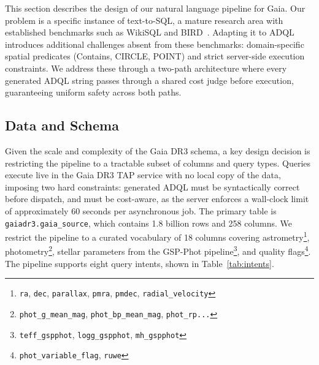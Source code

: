 \documentclass[fleqn,moreauthors,10pt]{ds_report}
\begin{document}
This section describes the design of our natural language pipeline for Gaia. 
Our problem is a specific instance of text-to-SQL, a mature research area with 
established benchmarks such as WikiSQL and 
BIRD~\cite{li2023llmservedatabaseinterface}. Adapting it to ADQL introduces 
additional challenges absent from these benchmarks: domain-specific spatial 
predicates (Contains, CIRCLE, POINT) and strict 
server-side execution constraints. We address these through a two-path 
architecture where every generated ADQL string passes through a shared cost 
judge before execution, guaranteeing uniform safety across both paths. 

\subsection{Data and Schema}

Given the scale and complexity of the Gaia DR3 schema, a key design decision 
is restricting the pipeline to a tractable subset of columns and query types. 
Queries execute live in the Gaia DR3 TAP service with no local copy of the
data, imposing two hard constraints: generated ADQL must be syntactically correct
before dispatch, and must be cost-aware, as the server enforces a wall-clock limit of approximately 60 seconds per asynchronous job. The primary table is
\texttt{gaiadr3.gaia\_source}, which contains 1.8 billion rows and 258 columns. We restrict the pipeline to a curated vocabulary of 18 columns covering
astrometry\footnote{\texttt{ra}, \texttt{dec}, \texttt{parallax}, \texttt{pmra},
\texttt{pmdec}, \texttt{radial\_velocity}}, photometry\footnote{\texttt{phot\_g\_mean\_mag}, \texttt{phot\_bp\_mean\_mag},
\texttt{phot\_rp...}}, stellar parameters from the GSP-Phot pipeline\footnote{\texttt{teff\_gspphot}, \texttt{logg\_gspphot},
\texttt{mh\_gspphot}}, and quality flags\footnote{\texttt{phot\_variable\_flag},
\texttt{ruwe}}. The pipeline supports eight query intents, shown in Table~\ref{tab:intents}.
\end{document}
